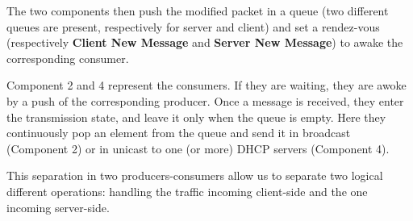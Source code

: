 The two components then push the modified packet in a queue (two different queues are present, respectively for server and client) and set a rendez-vous (respectively \textbf{Client New Message} and \textbf{Server New Message}) to awake the corresponding consumer.

Component 2 and 4 represent the consumers. If they are waiting, they are awoke by a push of the corresponding producer. Once a message is received, they enter the transmission state, and leave it only when the queue is empty. Here they continuously pop an element from the queue and send it in broadcast (Component 2) or in unicast to one (or more) DHCP servers (Component 4).

This separation in two producers-consumers allow us to separate two logical different operations: handling the traffic incoming client-side and the one incoming server-side. 